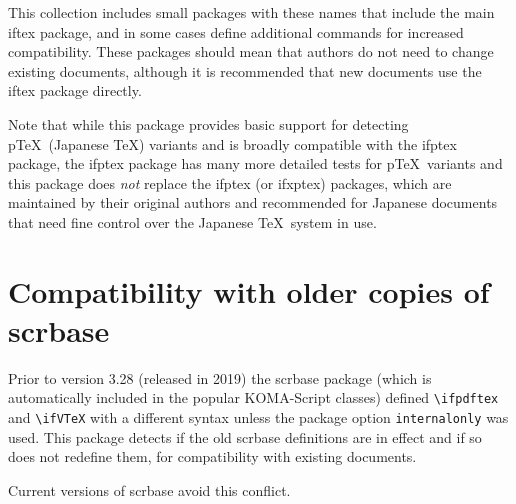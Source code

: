 \documentclass{article}
\begin{document}
This collection includes small packages with these names that include
the main \textsf{iftex} package, and in some cases define additional
commands for increased compatibility. These packages should mean that
authors do not need to change existing documents, although it is
recommended that new documents use the \textsf{iftex} package
directly.


Note that while this package provides basic support for detecting
p\TeX\ (Japanese \TeX) variants and is broadly compatible with the
\textsf{ifptex} package, the \textsf{ifptex} package has many more detailed
tests for p\TeX\ variants and this package does \emph{not} replace the
\textsf{ifptex} (or \textsf{ifxptex}) packages, which are maintained
by their original authors and recommended for Japanese documents that
need fine control over the Japanese \TeX\ system in use.

\section{Compatibility with older copies of \textsf{scrbase}}
Prior to version 3.28 (released in 2019) the \textsf{scrbase} package
(which is automatically included in the popular \textsf{KOMA-Script}
classes) defined \verb|\ifpdftex| and \verb|\ifVTeX| with a different
syntax unless the package option \verb|internalonly| was used.
This package detects if the old \textsf{scrbase} definitions
are in effect and if so does not redefine them, for compatibility
with existing documents.

Current versions of \textsf{scrbase} avoid this conflict.
\end{document}
